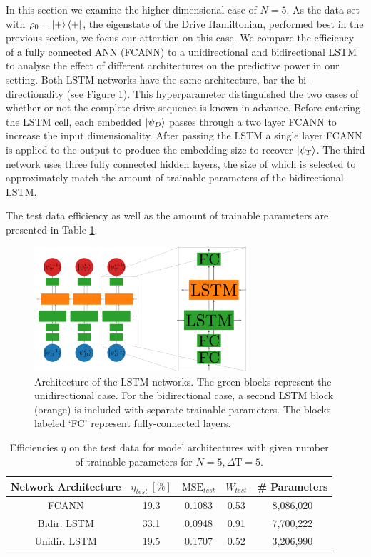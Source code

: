 In this section we examine the higher-dimensional case of $N=5$.
As the data set with $\rho_0 = \ket{+} \bra{+}$, the eigenstate of the Drive Hamiltonian, performed best in the previous section, we focus our attention on this case.
We compare the efficiency of a fully connected ANN (FCANN) to a unidirectional and bidirectional LSTM to analyse the effect of different architectures on the predictive power in our setting.
Both LSTM networks have the same architecture, bar the bi-directionality (see Figure \ref{lstm_network}).
This hyperparameter distinguished the two cases of whether or not the complete drive sequence is known in advance.
Before entering the LSTM cell, each embedded $\ket{\psi_D}$ passes through a two layer FCANN to increase the input dimensionality.
After passing the LSTM a single layer FCANN is applied to the output to produce the embedding size to recover $\ket{\psi_T}$.
The third network uses three fully connected hidden layers, the size of which is selected to approximately match the amount of trainable parameters of the bidirectional LSTM.

The test data efficiency as well as the amount of trainable parameters are presented in Table \ref{n5efftable}.

\begin{figure}
	\centering
	\includegraphics[width=0.7\textwidth]{img/lstm_network}
	\caption{Architecture of the LSTM networks. The green blocks represent the unidirectional case. For the bidirectional case, a second LSTM block (orange) is included with separate trainable parameters. The blocks labeled `FC' represent fully-connected layers.}
	\label{lstm_network}
\end{figure}

\begin{table}[h]
	\centering
	\begin{tabular}{ c | c | c | c | c}
		Network Architecture & $\eta_{test} \ [\%]$ & $\mathrm{MSE}_{test}$ & $W_{test}$ & \# Parameters \\
		\hline
		FCANN        & 19.3 & 0.1083 & 0.53 & 8,086,020 \\
		Bidir. LSTM  & 33.1 & 0.0948 & 0.91 & 7,700,222 \\
		Unidir. LSTM & 19.5 & 0.1707 & 0.52 & 3,206,990\\
	\end{tabular}
	\caption{Efficiencies $\eta$ on the test data for model architectures with given number of trainable parameters for $N=5, \Delta \mathrm{T} = 5$.}
	\label{n5efftable}
\end{table}

